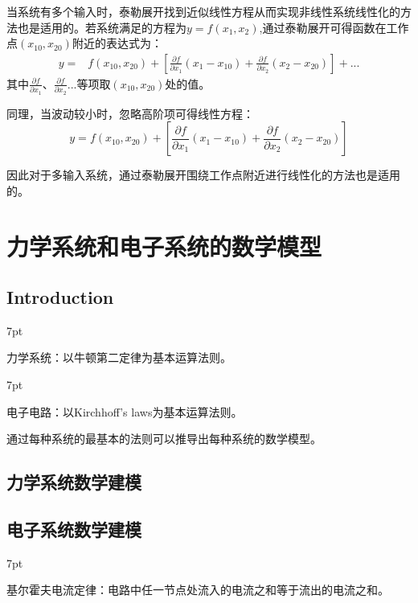 \documentclass{article}
\numberwithin{equation}{section}
\numberwithin{figure}{section}
\newenvironment{formal}{%
\def\FrameCommand{%
\hspace{1pt}%
{\color{DarkBlue}\vrule width 2pt}%
{\color{formalshade}\vrule width 4pt}%
\colorbox{formalshade}%
}%
\MakeFramed{\advance\hsize-\width\FrameRestore}%
\noindent\hspace{-4.55pt}%
\begin{adjustwidth}{}{7pt}%
\vspace{2pt}\vspace{2pt}%
}
{%
\vspace{2pt}\end{adjustwidth}\endMakeFramed%
}
\begin{document}
当系统有多个输入时，泰勒展开找到近似线性方程从而实现非线性系统线性化的方法也是适用的。若系统满足的方程为$y=f(x_1,x_2)$,通过泰勒展开可得函数在工作点$(x_{10},x_{20})$附近的表达式为：
\begin{equation}
    \begin{split}
        y=&f(x_{10},x_{20})+[\frac{\partial f}{\partial x_1}(x_1-x_{10})+\frac{\partial f}{\partial x_2}(x_2-x_{20})]+...
    \end{split}
\end{equation}
其中$\frac{\partial f}{\partial x_1}、\frac{\partial f}{\partial x_2}...$等项取$(x_{10},x_{20})$处的值。

同理，当波动较小时，忽略高阶项可得线性方程：
\begin{equation}
    y=f(x_{10},x_{20})+[\frac{\partial f}{\partial x_1}(x_1-x_{10})+\frac{\partial f}{\partial x_2}(x_2-x_{20})]
\end{equation}

因此对于多输入系统，通过泰勒展开围绕工作点附近进行线性化的方法也是适用的。

\newpage

\section{力学系统和电子系统的数学模型}
\subsection{Introduction}
\begin{formal}
    力学系统：以牛顿第二定律为基本运算法则。
\end{formal}

\begin{formal}
    电子电路：以Kirchhoff's laws为基本运算法则。
\end{formal}
    通过每种系统的最基本的法则可以推导出每种系统的数学模型。

\subsection{力学系统数学建模}

\subsection{电子系统数学建模}
\begin{formal}
    基尔霍夫电流定律：电路中任一节点处流入的电流之和等于流出的电流之和。
\end{formal}
\end{document}
